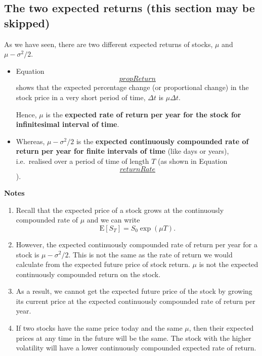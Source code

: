 \documentclass[
]{book}
\theoremstyle{definition}
\theoremstyle{definition}
\theoremstyle{definition}
\theoremstyle{definition}
\theoremstyle{remark}
\begin{document}
\hypertarget{the-two-expected-returns-this-section-may-be-skipped}{%
\subsection{The two expected returns (this section may be skipped)}\label{the-two-expected-returns-this-section-may-be-skipped}}

As we have seen, there are two different expected returns of stocks,
\(\mu\) and \(\mu - \sigma^2/2\).

\begin{itemize}
\item
  Equation \protect\hyperlink{propReturn}{\[propReturn\]} shows that the expected percentage change
  (or proportional change) in the stock price in a very short period
  of time, \(\Delta t\) is \(\mu \Delta t\).

  Hence, \(\mu\) is the \textbf{expected rate of return per year for the stock
  for infinitesimal interval of time}.
\item
  Whereas, \(\mu - \sigma^2/2\) is the \textbf{expected continuously
  compounded rate of return per year for finite intervals of time}
  (like days or years), i.e.~realised over a period of time of length
  \(T\) (as shown in Equation
  \protect\hyperlink{returnRate}{\[returnRate\]}).
\end{itemize}

\textbf{Notes}

\begin{enumerate}
\def\labelenumi{\arabic{enumi}.}
\item
  Recall that the expected price of a stock grows at the continuously
  compounded rate of \(\mu\) and we can write
  \[\mathrm{E}[S_T] = S_0 \exp(\mu T).\]
\item
  However, the expected continuously compounded rate of return per
  year for a stock is \(\mu - \sigma^2/2\). This is not the same as the
  rate of return we would calculate from the expected future price of
  stock return. \(\mu\) is not the expected continuously compounded
  return on the stock.
\item
  As a result, we cannot get the expected future price of the stock by
  growing its current price at the expected continuously compounded
  rate of return per year.
\item
  If two stocks have the same price today and the same \(\mu\), then
  their expected prices at any time in the future will be the same.
  The stock with the higher volatility will have a lower continuously
  compounded expected rate of return.
\end{enumerate}
\end{document}
